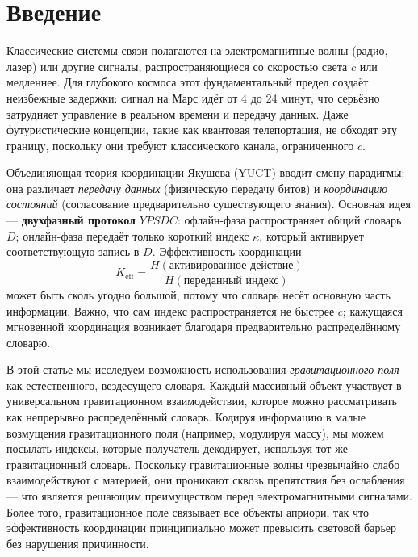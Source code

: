\documentclass[12pt,a4paper]{article}
\newcommand{\Keff}{K_{\mathrm{eff}}}
\newcommand{\YPSDC}{YPSDC}
\begin{document}
	\tableofcontents
	\newpage
	
	\section{Введение}
	\label{sec:intro}
	
	Классические системы связи полагаются на электромагнитные волны (радио, лазер) или другие сигналы, распространяющиеся со скоростью света \(c\) или медленнее. Для глубокого космоса этот фундаментальный предел создаёт неизбежные задержки: сигнал на Марс идёт от 4 до 24 минут, что серьёзно затрудняет управление в реальном времени и передачу данных. Даже футуристические концепции, такие как квантовая телепортация, не обходят эту границу, поскольку они требуют классического канала, ограниченного \(c\).
	
	Объединяющая теория координации Якушева (YUCT) \cite{Yakushev2026} вводит смену парадигмы: она различает \emph{передачу данных} (физическую передачу битов) и \emph{координацию состояний} (согласование предварительно существующего знания). Основная идея — \textbf{двухфазный протокол} \(\YPSDC\): офлайн-фаза распространяет общий словарь \(D\); онлайн-фаза передаёт только короткий индекс \(\kappa\), который активирует соответствующую запись в \(D\). Эффективность координации
	\begin{equation}
		\Keff = \frac{H(\text{активированное действие})}{H(\text{переданный индекс})}
	\end{equation}
	может быть сколь угодно большой, потому что словарь несёт основную часть информации. Важно, что сам индекс распространяется не быстрее \(c\); кажущаяся мгновенной координация возникает благодаря предварительно распределённому словарю.
	
	В этой статье мы исследуем возможность использования \emph{гравитационного поля} как естественного, вездесущего словаря. Каждый массивный объект участвует в универсальном гравитационном взаимодействии, которое можно рассматривать как непрерывно распределённый словарь. Кодируя информацию в малые возмущения гравитационного поля (например, модулируя массу), мы можем посылать индексы, которые получатель декодирует, используя тот же гравитационный словарь. Поскольку гравитационные волны чрезвычайно слабо взаимодействуют с материей, они проникают сквозь препятствия без ослабления — что является решающим преимуществом перед электромагнитными сигналами. Более того, гравитационное поле связывает все объекты априори, так что эффективность координации принципиально может превысить световой барьер без нарушения причинности.
	
\end{document}
